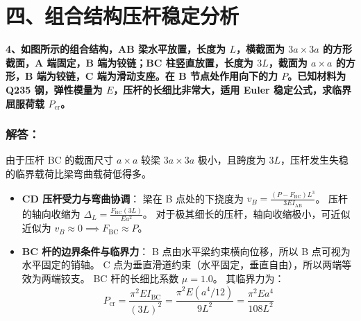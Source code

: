 \documentclass[UTF8,fontset=windows]{ctexart}
\begin{document}
\newpage

\section*{四、组合结构压杆稳定分析}

\textbf{4、如图所示的组合结构，AB 梁水平放置，长度为 $L$，横截面为 $3a \times 3a$ 的方形截面，A 端固定，B 端为铰链；BC 柱竖直放置，长度为 $3L$，截面为 $a \times a$ 的方形，B 端为铰链，C 端为滑动支座。在 B 节点处作用向下的力 $P$。已知材料为 Q235 钢，弹性模量为 $E$，压杆的长细比非常大，适用 Euler 稳定公式，求临界屈服荷载 $P_{\text{cr}}$。}

\subsubsection*{解答：}

由于压杆 BC 的截面尺寸 $a \times a$ 较梁 $3a \times 3a$ 极小，且跨度为 $3L$，压杆发生失稳的临界载荷比梁弯曲载荷低得多。
\begin{itemize}
    \item \textbf{CD 压杆受力与弯曲协调}：
    梁在 B 点处的下挠度为 $v_B = \frac{(P - F_{\text{BC}}) L^3}{3EI_{\text{AB}}}$。
    压杆的轴向收缩为 $\Delta_L = \frac{F_{\text{BC}}(3L)}{E a^2}$。
    对于极其细长的压杆，轴向收缩极小，可近似近似为 $v_B \approx 0 \implies F_{\text{BC}} \approx P$。
    \item \textbf{BC 杆的边界条件与临界力}：
    B 点由水平梁约束横向位移，所以 B 点可视为水平固定的销轴。
    C 点为垂直滑道约束（水平固定，垂直自由），所以两端等效为两端铰支。
    BC 杆的长细比系数 $\mu = 1.0$。
    其临界力为：
    \[
        P_{\text{cr}} = \frac{\pi^2 E I_{\text{BC}}}{(3L)^2} = \frac{\pi^2 E (a^4/12)}{9 L^2} = \frac{\pi^2 E a^4}{108 L^2}
    \]
\end{itemize}
\end{document}
